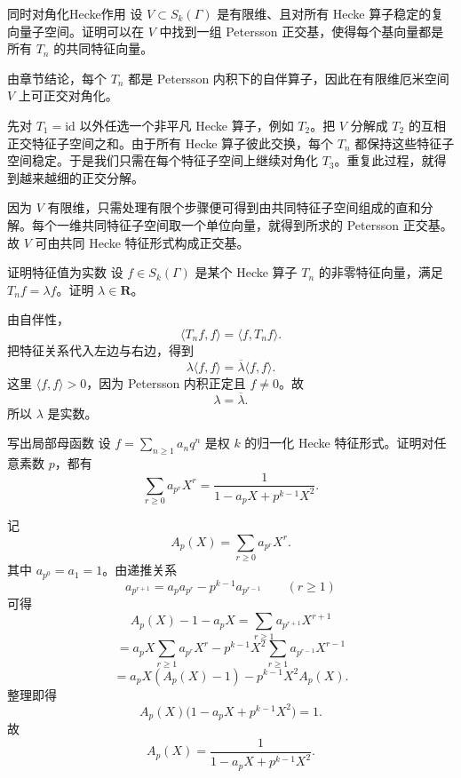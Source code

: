 \begin{problem}{同时对角化Hecke作用}
\hard
设 $V\subset S_k(\Gamma)$ 是有限维、且对所有 Hecke 算子稳定的复向量子空间。证明可以在 $V$ 中找到一组 Petersson 正交基，使得每个基向量都是所有 $T_n$ 的共同特征向量。
\end{problem}
\begin{solution}
由章节结论，每个 $T_n$ 都是 Petersson 内积下的自伴算子，因此在有限维厄米空间 $V$ 上可正交对角化。

先对 $T_1=\mathrm{id}$ 以外任选一个非平凡 Hecke 算子，例如 $T_2$。把 $V$ 分解成 $T_2$ 的互相正交特征子空间之和。由于所有 Hecke 算子彼此交换，每个 $T_n$ 都保持这些特征子空间稳定。于是我们只需在每个特征子空间上继续对角化 $T_3$。重复此过程，就得到越来越细的正交分解。

因为 $V$ 有限维，只需处理有限个步骤便可得到由共同特征子空间组成的直和分解。每个一维共同特征子空间取一个单位向量，就得到所求的 Petersson 正交基。故 $V$ 可由共同 Hecke 特征形式构成正交基。
\end{solution}

\begin{problem}{证明特征值为实数}
\hard
设 $f\in S_k(\Gamma)$ 是某个 Hecke 算子 $T_n$ 的非零特征向量，满足 $T_nf=\lambda f$。证明 $\lambda\in\mathbf R$。
\end{problem}
\begin{solution}
由自伴性，
\[
\langle T_nf,f\rangle=\langle f,T_nf\rangle.
\]
把特征关系代入左边与右边，得到
\[
\lambda\langle f,f\rangle=\overline{\lambda}\langle f,f\rangle.
\]
这里 $\langle f,f\rangle>0$，因为 Petersson 内积正定且 $f\neq0$。故
\[
\lambda=\overline{\lambda}.
\]
所以 $\lambda$ 是实数。
\end{solution}

\begin{problem}{写出局部母函数}
\hard
设 $f=\sum_{n\ge1}a_nq^n$ 是权 $k$ 的归一化 Hecke 特征形式。证明对任意素数 $p$，都有
\[
\sum_{r\ge0}a_{p^r}X^r=\frac{1}{1-a_pX+p^{k-1}X^2}.
\]
\end{problem}
\begin{solution}
记
\[
A_p(X)=\sum_{r\ge0}a_{p^r}X^r.
\]
其中 $a_{p^0}=a_1=1$。由递推关系
\[
a_{p^{r+1}}=a_pa_{p^r}-p^{k-1}a_{p^{r-1}}\qquad (r\ge1)
\]
可得
\[
A_p(X)-1-a_pX=\sum_{r\ge1}a_{p^{r+1}}X^{r+1}
\]
\[
=a_pX\sum_{r\ge1}a_{p^r}X^r-p^{k-1}X^2\sum_{r\ge1}a_{p^{r-1}}X^{r-1}
\]
\[
=a_pX(A_p(X)-1)-p^{k-1}X^2A_p(X).
\]
整理即得
\[
A_p(X)\bigl(1-a_pX+p^{k-1}X^2\bigr)=1.
\]
故
\[
A_p(X)=\frac{1}{1-a_pX+p^{k-1}X^2}.
\]
\end{solution}

